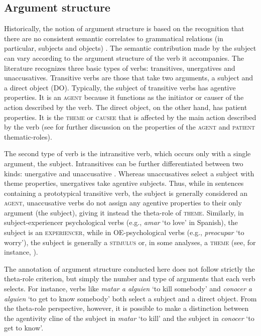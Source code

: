 \subsection{Argument structure} \label{sub:6.4.3}
Historically, the notion of argument structure is based on the recognition that there are no consistent semantic correlates to grammatical relations (in particular, subjects and objects) \parencite{waltereit2017argument}.
The semantic contribution made by the subject can vary according to the argument structure of the verb it accompanies. The literature \parencite{hale2002prolegomenon, levin2005argument} recognizes three basic types of verbs: transitives, unergatives and unaccusatives. Transitive verbs are those that take two arguments, a subject and a direct object (DO). Typically, the subject of transitive verbs has agentive properties. It is an \textsc{agent} because it functions as the initiator or causer of the action described by the verb. The direct object, on the other hand, has patient properties. It is the \textsc{theme} or \textsc{causee} that is affected by the main action described by the verb (see \cite{dowty1991thematic} for further discussion on the properties of the \textsc{agent} and \textsc{patient} thematic-roles). 

The second type of verb is the intransitive verb, which occurs only with a single argument, the subject. Intransitives can be further differentiated between two kinds: unergative and unaccusative \parencite{perlmutter1978impersonal}. Whereas unaccusatives select a subject with theme properties, unergatives take agentive subjects.
Thus, while in sentences containing a prototypical transitive verb, the subject is generally considered an \textsc{agent}, unaccusative verbs do not assign any agentive properties to their only argument (the subject), giving it instead the theta-role of \textsc{theme}. Similarly, in subject-experiencer psychological verbs (e.g., \textit{amar} `to love' in Spanish), the subject is an \textsc{experiencer}, while in OE-psychological verbs (e.g.,  \textit{preocupar} `to worry'), the subject is generally a \textsc{stimulus} or, in some analyses, a \textsc{theme} (see, for instance, \cite{gutierrez2013structural}). 

The annotation of argument structure conducted here does not follow strictly the theta-role criterion, but simply the number and type of arguments that each verb selects. For instance, verbs like \textit{matar a alguien} `to kill somebody' and \textit{conocer a alguien} `to get to know somebody' both select a subject and a direct object. From the theta-role perspective, however, it is possible to make a distinction between the agentivity cline of the subject in \textit{matar} `to kill' and the subject in \textit{conocer} `to get to know'. 

